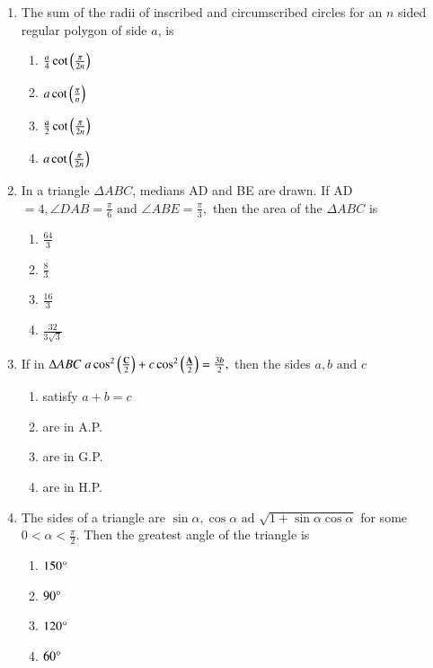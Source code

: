\begin{enumerate}[label=\thesubsection.\arabic*,ref=\thesubsection.\theenumi]
        \item The sum of the radii of inscribed and circumscribed circles for an $n$ sided regular polygon of side $a$, is \hfill{}
\begin{multicols}{4}
\begin{enumerate}
        \item $\frac{a}{4} \cot{\ensuremath{\left(\frac{\pi}{2n}\right)}}$         
        \item $ a \cot{\ensuremath{\left(\frac{\pi}{n}\right)}}$ 
        \item $\frac{a}{2} \cot{\ensuremath{\left(\frac{\pi}{2n}\right)}}$ 
        \item $ a \cot{\ensuremath{\left(\frac{\pi}{2n}\right)}}$
\end{enumerate}
\end{multicols}

\item In a triangle $\Delta{ABC}$, medians AD and BE are drawn. If AD$=4,\angle{DAB}=\frac{\pi}{6} \text{ and } \angle{ABE}=\frac{\pi}{3},$ then the area of the $\Delta{ABC}$ is \hfill{}
\begin{multicols}{4}
\begin{enumerate}
        \item $\frac{64}{3}$                    
        \item $\frac{8}{3}$ 
        \item $\frac{16}{3}$ 
        \item $\frac{32}{3\sqrt{3}}$
\end{enumerate}
\end{multicols} 

\item If in $\Delta{ABC}\;a\cos^2\left(\frac{\mathbf{C}}{2}\right) + c\cos^2\left(\frac{\mathbf{A}}{2}\right) = \frac{3b}{2},$ then the sides $a,b\text{ and }c$ \hfill{}
\begin{multicols}{4}
\begin{enumerate}
        \item satisfy $a+b=c$                    
        \item are in A.P. 
        \item are in G.P. 
        \item are in H.P.
\end{enumerate}
\end{multicols} 

\item The sides of a triangle are $\sin\alpha,\cos\alpha \text{ ad } \sqrt{1+\sin\alpha\cos\alpha}$ for some $0<\alpha<\frac{\pi}{2}.$ Then the greatest angle of the triangle is \hfill{}
\begin{multicols}{4}
\begin{enumerate}
        \item $150\degree$                    
        \item $90\degree$ 
        \item $120\degree$
        \item $60\degree$
\end{enumerate}
\end{multicols} 


\end{enumerate}
